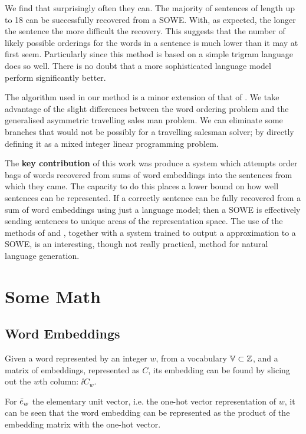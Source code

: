 \documentclass{book}
\begin{document}
We find that surprisingly often they can.
The majority of sentences of length up to 18 can be successfully recovered from a SOWE.
With, as expected, the longer the sentence the more difficult the recovery.
This suggests that the number of likely possible orderings for the words in a sentence is much lower than it may at first seem.
Particularly since this method is based on a simple trigram language does so well.
There is no doubt that a more sophisticated language model perform significantly better.


The algorithm used in our method is a minor extension of that of \citet{Horvat2014}.
We take advantage of the slight differences between the word ordering problem and the generalised asymmetric travelling sales man problem.
We can eliminate some branches that would not be possibly for a travelling salesman solver; by directly defining it as a mixed integer linear programming problem.


The \textbf{key contribution} of this work was produce a system which attempts order bags of words recovered from sums of word embeddings into the sentences from which they came.
The capacity to do this places a lower bound on how well sentences can be represented.
If a correctly sentence can be fully recovered from a sum of word embeddings using just a language model;
then a SOWE is effectively sending sentences to unique areas of the representation space.
The use of the methods of  and ,
together with a system trained to output a approximation to a SOWE, is an interesting, though not really practical, method for natural language generation.

\section{Some Math}
\subsection{Word Embeddings}
Given a word represented by an integer $w$, from a vocabulary $\mathbb{V} \subset \mathbb{Z}$,
and a matrix of embeddings, represented as $C$, 
its embedding can be found by slicing out the $w$th column:
$\ii C_w$.

For $\iv e_w$ the elementary unit vector, i.e. the one-hot vector representation of $w$,
it can be seen that the word embedding can be represented as the product of the embedding matrix with the one-hot vector.
\end{document}
